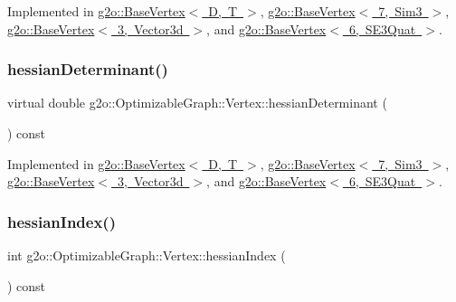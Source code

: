 Implemented in \mbox{\hyperlink{classg2o_1_1_base_vertex_aedf92fbb5c2c86185422a955be02a3a6}{g2o\+::\+Base\+Vertex$<$ D, T $>$}}, \mbox{\hyperlink{classg2o_1_1_base_vertex_aedf92fbb5c2c86185422a955be02a3a6}{g2o\+::\+Base\+Vertex$<$ 7, Sim3 $>$}}, \mbox{\hyperlink{classg2o_1_1_base_vertex_aedf92fbb5c2c86185422a955be02a3a6}{g2o\+::\+Base\+Vertex$<$ 3, Vector3d $>$}}, and \mbox{\hyperlink{classg2o_1_1_base_vertex_aedf92fbb5c2c86185422a955be02a3a6}{g2o\+::\+Base\+Vertex$<$ 6, S\+E3\+Quat $>$}}.

\mbox{\label{classg2o_1_1_optimizable_graph_1_1_vertex_adaed502500d9ddc9f1721aba635da4d6}} 
\subsubsection{\texorpdfstring{hessian\+Determinant()}{hessianDeterminant()}}
{\footnotesize\ttfamily virtual double g2o\+::\+Optimizable\+Graph\+::\+Vertex\+::hessian\+Determinant (\begin{DoxyParamCaption}{ }\end{DoxyParamCaption}) const\hspace{0.3cm}{\ttfamily [pure virtual]}}



Implemented in \mbox{\hyperlink{classg2o_1_1_base_vertex_a1217e0fe47e7259f039d468397cddb15}{g2o\+::\+Base\+Vertex$<$ D, T $>$}}, \mbox{\hyperlink{classg2o_1_1_base_vertex_a1217e0fe47e7259f039d468397cddb15}{g2o\+::\+Base\+Vertex$<$ 7, Sim3 $>$}}, \mbox{\hyperlink{classg2o_1_1_base_vertex_a1217e0fe47e7259f039d468397cddb15}{g2o\+::\+Base\+Vertex$<$ 3, Vector3d $>$}}, and \mbox{\hyperlink{classg2o_1_1_base_vertex_a1217e0fe47e7259f039d468397cddb15}{g2o\+::\+Base\+Vertex$<$ 6, S\+E3\+Quat $>$}}.

\mbox{\label{classg2o_1_1_optimizable_graph_1_1_vertex_a05a371cfa6314d0f2d209289b01cc922}} 
\subsubsection{\texorpdfstring{hessian\+Index()}{hessianIndex()}}
{\footnotesize\ttfamily int g2o\+::\+Optimizable\+Graph\+::\+Vertex\+::hessian\+Index (\begin{DoxyParamCaption}{ }\end{DoxyParamCaption}) const\hspace{0.3cm}{\ttfamily [inline]}}




